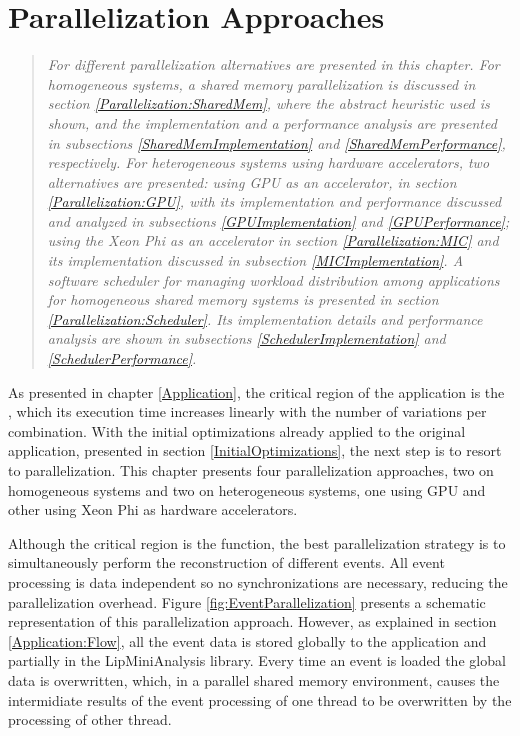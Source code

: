 \chapter{Parallelization Approaches}
\label{ParallelizationApproaches}

\begin{quote}
\textit{For different parallelization alternatives are presented in this chapter. For homogeneous systems, a shared memory parallelization is discussed in section \ref{Parallelization:SharedMem}, where the abstract heuristic used is shown, and the implementation and a performance analysis are presented in subsections \ref{SharedMemImplementation} and \ref{SharedMemPerformance}, respectively. For heterogeneous systems using hardware accelerators, two alternatives are presented: using GPU as an accelerator, in section \ref{Parallelization:GPU}, with its implementation and performance discussed and analyzed in subsections \ref{GPUImplementation} and \ref{GPUPerformance}; using the \intel Xeon Phi as an accelerator in section \ref{Parallelization:MIC} and its implementation discussed in subsection \ref{MICImplementation}. A software scheduler for managing workload distribution among applications for homogeneous shared memory systems is presented in section \ref{Parallelization:Scheduler}. Its implementation details and performance analysis are shown in subsections \ref{SchedulerImplementation} and \ref{SchedulerPerformance}.}
\end{quote}

As presented in chapter \ref{Application}, the critical region of the \tth application is the \ttDilepKinFit, which its execution time increases linearly with the number of variations per combination. With the initial optimizations already applied to the original application, presented in section \ref{InitialOptimizations}, the next step is to resort to parallelization. This chapter presents four parallelization approaches, two on homogeneous systems and two on heterogeneous systems, one using GPU and other using \intel Xeon Phi as hardware accelerators.

Although the critical region is the \ttDilepKinFit function, the best parallelization strategy is to simultaneously perform the reconstruction of different events. All event processing is data independent so no synchronizations are necessary, reducing the parallelization overhead. Figure \ref{fig:EventParallelization} presents a schematic representation of this parallelization approach. However, as explained in section \ref{Application:Flow}, all the event data is stored globally to the application and partially in the LipMiniAnalysis library. Every time an event is loaded the global data is overwritten, which, in a parallel shared memory environment, causes the intermidiate results of the event processing of one thread to be overwritten by the processing of other thread.

